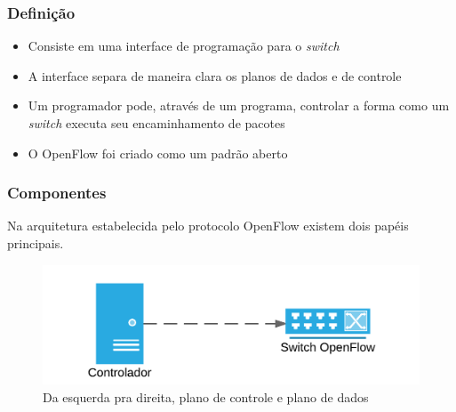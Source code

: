 %
%
\begin{frame}\frametitle{Definição}

    \begin{itemize}
        \setlength{\itemsep}{.5cm}
        \item Consiste em uma interface de programação para o \emph{switch}
        \item A interface separa de maneira clara os planos de dados e de 
            controle
        \item Um programador pode, através de um programa, controlar a
            forma como um \emph{switch} executa seu encaminhamento de pacotes
        \item O OpenFlow foi criado como um padrão aberto
    \end{itemize}
\end{frame}


%
%
\begin{frame}\frametitle{Componentes}
    Na arquitetura estabelecida pelo protocolo OpenFlow existem dois papéis
    principais.

    \begin{figure}[h]
        \centering
        \includegraphics{images/controller-secure-switch}
        \caption{Da esquerda pra direita, plano de controle e plano de dados}
    \end{figure}

\end{frame}


